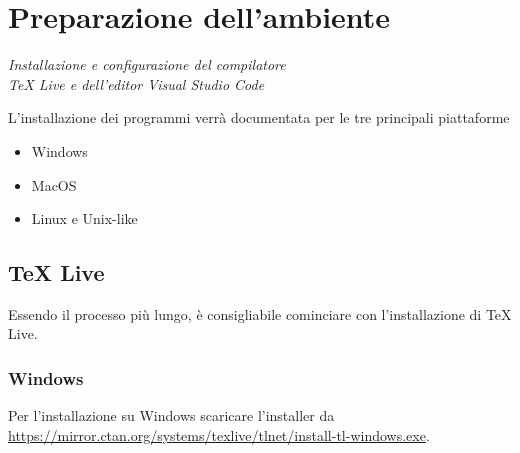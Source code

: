 \documentclass[envcountsame,envcountchap]{svmono}
\begin{document}
\mainmatter%


\chapter{Preparazione dell'ambiente} \label{Cap.1}

\vspace{2cm}

\begin{flushright}
\textit{Installazione e configurazione del compilatore\\ TeX Live e dell'editor Visual Studio Code}
\end{flushright}

\vspace{0.5cm}

L'installazione dei programmi verrà documentata per le tre principali piattaforme
\begin{itemize}
    \item Windows
    \item MacOS
    \item Linux e Unix-like
\end{itemize}

\section{TeX Live}\label{sezione}
Essendo il processo più lungo, è consigliabile cominciare con l'installazione di TeX Live.

\subsection{Windows}\label{sottosezione}
\label{esempio_url}
Per l'installazione su Windows scaricare l'installer da \url{https://mirror.ctan.org/systems/texlive/tlnet/install-tl-windows.exe}.
\end{document}
